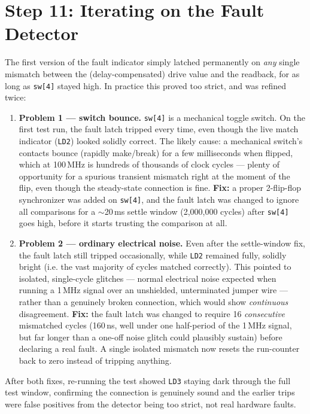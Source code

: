 \documentclass[11pt]{article}
\begin{document}
\section{Step 11: Iterating on the Fault Detector}
\label{sec:faultlatch}
\label{sec:iterating}

The first version of the fault indicator simply latched permanently on \emph{any} single
mismatch between the (delay-compensated) drive value and the readback, for as long as
\texttt{sw[4]} stayed high. In practice this proved too strict, and was refined twice:

\begin{enumerate}
    \item \textbf{Problem 1 --- switch bounce.} \texttt{sw[4]} is a mechanical toggle
    switch. On the first test run, the fault latch tripped every time, even though the
    live match indicator (\texttt{LD2}) looked solidly correct. The likely cause: a
    mechanical switch's contacts bounce (rapidly make/break) for a few milliseconds when
    flipped, which at 100\,MHz is hundreds of thousands of clock cycles --- plenty of
    opportunity for a spurious transient mismatch right at the moment of the flip, even
    though the steady-state connection is fine.
    \textbf{Fix:} a proper 2-flip-flop synchronizer was added on \texttt{sw[4]}, and the
    fault latch was changed to ignore all comparisons for a $\sim$20\,ms settle window
    (2,000,000 cycles) after \texttt{sw[4]} goes high, before it starts trusting the
    comparison at all.
    \item \textbf{Problem 2 --- ordinary electrical noise.} Even after the settle-window
    fix, the fault latch still tripped occasionally, while \texttt{LD2} remained fully,
    solidly bright (i.e. the vast majority of cycles matched correctly). This pointed to
    isolated, single-cycle glitches --- normal electrical noise expected when running a
    1\,MHz signal over an unshielded, unterminated jumper wire --- rather than a genuinely
    broken connection, which would show \emph{continuous} disagreement.
    \textbf{Fix:} the fault latch was changed to require 16 \emph{consecutive} mismatched
    cycles (160\,ns, well under one half-period of the 1\,MHz signal, but far longer than
    a one-off noise glitch could plausibly sustain) before declaring a real fault. A
    single isolated mismatch now resets the run-counter back to zero instead of tripping
    anything.
\end{enumerate}

After both fixes, re-running the test showed \texttt{LD3} staying dark through the full
test window, confirming the connection is genuinely sound and the earlier trips were
false positives from the detector being too strict, not real hardware faults.
\end{document}
